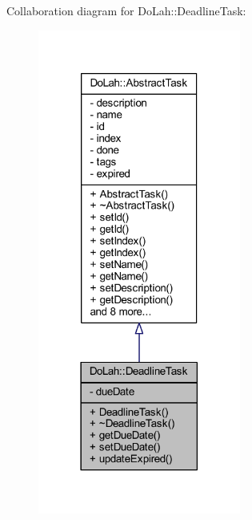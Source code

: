 Collaboration diagram for Do\+Lah\+:\+:Deadline\+Task\+:\nopagebreak
\begin{figure}[H]
\begin{center}
\leavevmode
\includegraphics[width=189pt]{class_do_lah_1_1_deadline_task__coll__graph}
\end{center}
\end{figure}
